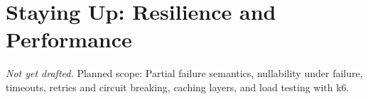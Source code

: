 \chapter{Staying Up: Resilience and Performance}
\label{ch:resilience-and-performance}

\emph{Not yet drafted.} Planned scope: Partial failure semantics, nullability under failure, timeouts, retries and circuit breaking, caching layers, and load testing with k6.

% 
